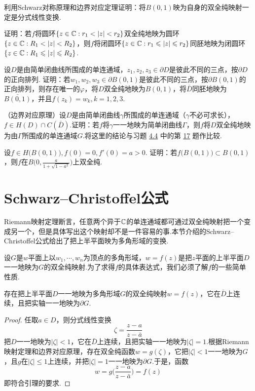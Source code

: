 \begin{xiti}\hypertarget{xiti7.3}{}
  \item 利用Schwarz对称原理和边界对应定理证明：将$B(0,1)$映为自身的双全纯映射一定是分式线性变换.
  \item \hypertarget{xiti7.3.2}{} 证明：若$f$将圆环$\{z\in\MC:r_1<|z|<r_2\}$双全纯地映为圆环
        $\{z\in\MC:R_1<|z|<R_2\}$，则$f$将闭圆环$\{z\in\mathbb C:r_1\leqslant|z|\leqslant r_2\}$同胚地映为闭圆环$\{z\in\mathbb C:R_1\leqslant|z|\leqslant R_2\}$.
  \item 设$D$是由简单闭曲线所围成的单连通域，$z_1,z_2,z_3\in\partial D$是彼此不同的三点，按$\partial D$的正向排列. 证明：若$w_1,w_2,w_3\in\partial B(0,1)$是彼此不同的三点，按$\partial B(0,1)$的正向排列，则存在唯一的$\varphi$，将$D$双全纯地映为$B(0,1)$，将$\bar D$同胚地映为$\bar{B(0,1)}$，并且$f(z_k)=w_k,k=1,2,3$.
  \item （边界对应原理）设$D$是由简单闭曲线$\gamma$所围成的单连通域（$\gamma$不必可求长），$f\in H(D)\cap C(\bar D)$.证明：若$f$将$\gamma$一一地映为简单闭曲线$\Gamma$，则$f$将$D$双全纯地映为由$\Gamma$所围成的单连通域$G$.将这里的结论与习题 \hyperlink{xiti4.4}{4.4} 中的第
      \hyperlink{xiti4.4.17}{17} 题作比较.
  \item 设$f\in H\big(B(0,1)\big),f(0)=0,f'(0)=a>0$. 证明：若$f\big(B(0,1)\big)\subset B(0,1)$，则$f$在$B\bigg(0,\frac a{1+\sqrt{1-a^2}}\bigg)$上双全纯.
\end{xiti}

\section{Schwarz--Christoffel公式\label{sec7.4}}
Riemann映射定理断言，任意两个异于$\mathbb C$的单连通域都可通过双全纯映射把一个变成另一个，但是具体写出这个映射却不是一件容易的事.本节介绍的Schwarz--Christoffel公式给出了把上半平面映为多角形域的变换.

设$G$是$w$平面上以$w_1,\cdots,w_n$为顶点的多角形域，$w=f(z)$是把$z$平面的上半平面$D$一一地映为$G$的双全纯映射.为了求得$f$的具体表达式，我们必须了解$f$的一些简单性质.
\begin{lemma}\label{lemma7.4.1}
  存在把上半平面$D$一一地映为多角形域$G$的双全纯映射$w=f(z)$，它在$\bar D$上连续，且把实轴一一地映为$ \partial G$.
\end{lemma}
\begin{proof}
  任取$a\in D$，则分式线性变换
  \[
    \zeta = \frac{z-a}{z-\bar a}
  \]
  把$D$一一地映为$|\zeta|<1$，它在$\bar D$上连续，且把实轴一一地映为$|\zeta|=1$.根据Riemann映射定理和边界对应原理，存在双全纯函数$w=g(\zeta)$，它把$|\zeta|<1$一一地映为$G$，且$g$在$|\zeta|\le1$上连续，并把$|\zeta|=1$一一地映为$\partial G$.于是，函数
  \[
    w = g\bigg(\frac{z-a}{z-\bar a}\bigg) = f(z)
  \]
  即符合引理的要求.
\end{proof}

